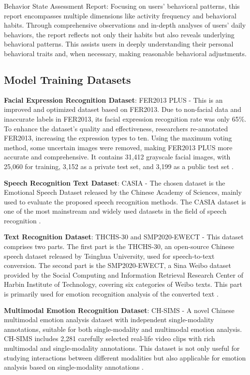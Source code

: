\documentclass[preprint,12pt]{elsarticle}
\begin{document}
Behavior State Assessment Report: Focusing on users' behavioral patterns, this report encompasses multiple dimensions like activity frequency and behavioral habits. Through comprehensive observations and in-depth analyses of users' daily behaviors, the report reflects not only their habits but also reveals underlying behavioral patterns. This assists users in deeply understanding their personal behavioral traits and, when necessary, making reasonable behavioral adjustments.

\subsection{Model Training Datasets}

\textbf{Facial Expression Recognition Dataset}: FER2013 PLUS - This is an improved and optimized dataset based on FER2013. Due to non-facial data and inaccurate labels in FER2013, its facial expression recognition rate was only 65\%. To enhance the dataset's quality and effectiveness, researchers re-annotated FER2013, increasing the expression types to ten. Using the maximum voting method, some uncertain images were removed, making FER2013 PLUS more accurate and comprehensive. It contains 31,412 grayscale facial images, with 25,060 for training, 3,152 as a private test set, and 3,199 as a public test set \cite{ref50}.

\textbf{Speech Recognition Text Dataset}: CASIA - The chosen dataset is the Emotional Speech Dataset released by the Chinese Academy of Sciences, mainly used to evaluate the proposed speech recognition methods. The CASIA dataset is one of the most mainstream and widely used datasets in the field of speech recognition \cite{ref52}.

\textbf{Text Recognition Dataset}: THCHS-30 and SMP2020-EWECT - This dataset comprises two parts. The first part is the THCHS-30, an open-source Chinese speech dataset released by Tsinghua University, used for speech-to-text conversion. The second part is the SMP2020-EWECT, a Sina Weibo dataset provided by the Social Computing and Information Retrieval Research Center of Harbin Institute of Technology, covering six categories of Weibo texts. This part is primarily used for emotion recognition analysis of the converted text \cite{ref53, ref54}.

\textbf{Multimodal Emotion Recognition Dataset}: CH-SIMS - A novel Chinese multimodal emotion analysis dataset with independent single-modality annotations, suitable for both single-modality and multimodal emotion analysis. CH-SIMS includes 2,281 carefully selected real-life video clips with rich multimodal and single-modality annotations. This dataset is not only useful for studying interactions between different modalities but also applicable for emotion analysis based on single-modality annotations \cite{ref54}.
\end{document}
